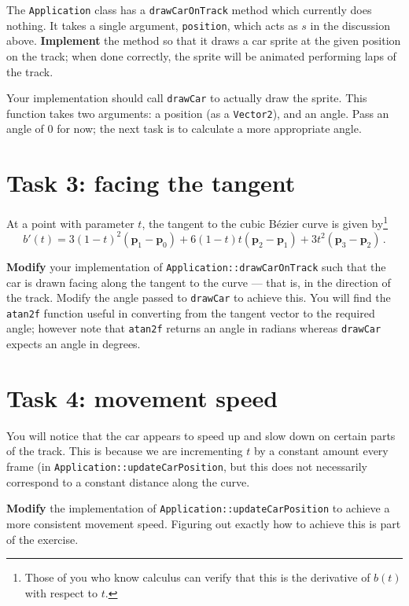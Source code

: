\documentclass{../../../fal_assignment}
\begin{document}
The \lstinline{Application} class has a \lstinline{drawCarOnTrack} method which currently does nothing.
It takes a single argument, \lstinline{position}, which acts as $s$ in the discussion above.
\textbf{Implement} the method so that it draws a car sprite at the given position on the track;
when done correctly, the sprite will be animated performing laps of the track.

Your implementation should call \lstinline{drawCar} to actually draw the sprite.
This function takes two arguments: a position (as a \lstinline{Vector2}), and an angle.
Pass an angle of 0 for now; the next task is to calculate a more appropriate angle.

\section*{Task 3: facing the tangent}

At a point with parameter $t$, the tangent to the cubic B\'ezier curve is given by\footnote{Those of you who know calculus can verify that this is the derivative of $b(t)$ with respect to $t$.}
$$ b'(t) = 3(1-t)^2(\mathbf{p}_1 - \mathbf{p}_0) + 6(1-t)t(\mathbf{p}_2 - \mathbf{p}_1) + 3t^2 (\mathbf{p}_3 - \mathbf{p}_2) \,. $$

\textbf{Modify} your implementation of \lstinline{Application::drawCarOnTrack} such that the car is drawn
facing along the tangent to the curve --- that is, in the direction of the track.
Modify the angle passed to \lstinline{drawCar} to achieve this.
You will find the \lstinline{atan2f} function useful in converting from the tangent vector to the required
angle; however note that \lstinline{atan2f} returns an angle in radians whereas \lstinline{drawCar}
expects an angle in degrees.

\section*{Task 4: movement speed}

You will notice that the car appears to speed up and slow down on certain parts of the track.
This is because we are incrementing $t$ by a constant amount every frame (in \lstinline{Application::updateCarPosition}, but this does not necessarily
correspond to a constant distance along the curve.

\textbf{Modify} the implementation of \lstinline{Application::updateCarPosition} to achieve a more consistent movement speed.
Figuring out exactly how to achieve this is part of the exercise.
\end{document}

